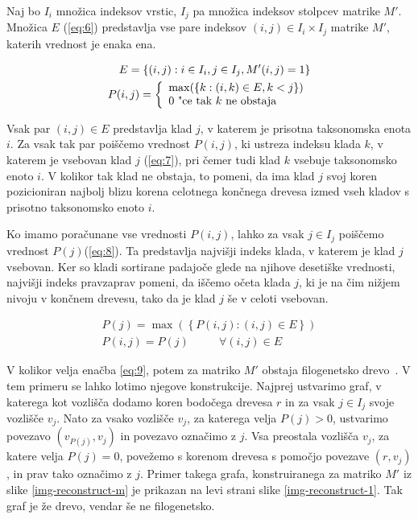 \documentclass[a4paper, 12pt]{book}
\begin{document}
Naj bo $I_i$ množica indeksov vrstic, $I_j$ pa množica indeksov stolpcev matrike $M'$. Množica $E$ (\ref{eq:6}) predstavlja vse pare indeksov $(i, j) \in I_i \times I_j$ matrike $M'$, katerih vrednost je enaka ena.

\begin{align}
	E = \left\{ {(i, j): i \in I_i, j \in I_j, M'(i, j) = 1} \right\} \label{eq:6} \\
	P(i, j) = 
		\left\{
		\begin{array}{ll}
			\max(\left\{k: (i, k) \in E, k < j\right\}) \\
			0 $      "ce tak $k$ ne obstaja$
		\end{array}
		\right.
	\label{eq:7}
\end{align}

Vsak par $(i, j) \in E$ predstavlja klad $j$, v katerem je prisotna taksonomska enota $i$. Za vsak tak par poiščemo vrednost $P(i, j)$, ki ustreza indeksu klada $k$, v katerem je vsebovan klad $j$ (\ref{eq:7}), pri čemer tudi klad $k$ vsebuje taksonomsko enoto $i$. V kolikor tak klad ne obstaja, to pomeni, da ima klad $j$ svoj koren pozicioniran najbolj blizu korena celotnega končnega drevesa izmed vseh kladov s prisotno taksonomsko enoto $i$. 

Ko imamo poračunane vse vrednosti $P(i, j)$, lahko za vsak $j \in I_j$ poiščemo vrednost $P(j)$(\ref{eq:8}). Ta predstavlja najvišji indeks klada, v katerem je klad $j$ vsebovan. Ker so kladi sortirane padajoče glede na njihove desetiške vrednosti, najvišji indeks pravzaprav pomeni, da iščemo očeta klada $j$, ki je na čim nižjem nivoju v končnem drevesu, tako da je klad $j$ še v celoti vsebovan.
	
\begin{align}
	P(j) = \max(\left\{P(i, j): (i, j) \in E\right\}) \label{eq:8} \\
	P(i, j) = P(j)   ~~~~~~~~~~~~  \forall (i, j) \in E \label{eq:9}
\end{align}

V kolikor velja enačba \ref{eq:9}, potem za matriko $M'$ obstaja filogenetsko drevo~\cite{gd}. V tem primeru se lahko lotimo njegove konstrukcije. Najprej ustvarimo graf, v katerega kot vozlišča dodamo koren bodočega drevesa $r$ in za vsak $j \in I_j$ svoje vozlišče $v_j$. Nato za vsako vozlišče $v_j$, za katerega velja $P(j) > 0$, ustvarimo povezavo $(v_{P(j)}, v_j)$ in povezavo označimo z $j$. Vsa preostala vozlišča $v_j$, za katere velja $P(j) = 0$, povežemo s korenom drevesa s pomočjo povezave $(r, v_j)$, in prav tako označimo z $j$. Primer takega grafa, konstruiranega za matriko $M'$ iz slike \ref{img-reconstruct-m} je prikazan na levi strani slike \ref{img-reconstruct-1}. Tak graf je že drevo, vendar še ne filogenetsko.
\end{document}
